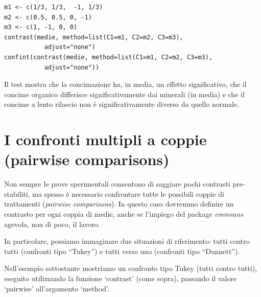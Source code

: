 \documentclass[a4paper,12pt,oneside]{book}
\theoremstyle{definition}
\theoremstyle{definition}
\theoremstyle{definition}
\theoremstyle{remark}
\begin{document}
\begin{verbatim}
m1 <- c(1/3, 1/3,  -1, 1/3)
m2 <- c(0.5, 0.5, 0, -1)
m3 <- c(1, -1, 0, 0)
contrast(medie, method=list(C1=m1, C2=m2, C3=m3), 
           adjust="none")
confint(contrast(medie, method=list(C1=m1, C2=m2, C3=m3), 
           adjust="none"))
\end{verbatim}

\normalsize

Il test mostra che la concimazione ha, in media, un effetto
significativo, che il concime organico differisce significativamente dai
minerali (in media) e che il concime a lento rilascio non è
significativamente diverso da quello normale.

\section{I confronti multipli a coppie (pairwise
comparisons)}\label{i-confronti-multipli-a-coppie-pairwise-comparisons}

Non sempre le prove sperimentali consentono di saggiare pochi contrasti
pre-stabiliti, ma spesso è necessario confrontare tutte le possibili
coppie di trattamenti (\emph{pairwise comparisons}). In questo caso
dovremmo definire un contrasto per ogni coppia di medie, anche se
l'impiego del package \emph{emmeans} agevola, non di poco, il lavoro.

In particolare, possiamo immaginare due situazioni di riferimento: tutti
contro tutti (confronti tipo ``Tukey'') e tutti verso uno (confronti
tipo ``Dunnett'').

Nell'esempio sottostante mostriamo un confronto tipo Tukey (tutti contro
tutti), eseguito utilizzando la funzione `contrast' (come sopra),
passando il valore `pairwise' all'argomento `method'.

\footnotesize
\end{document}
